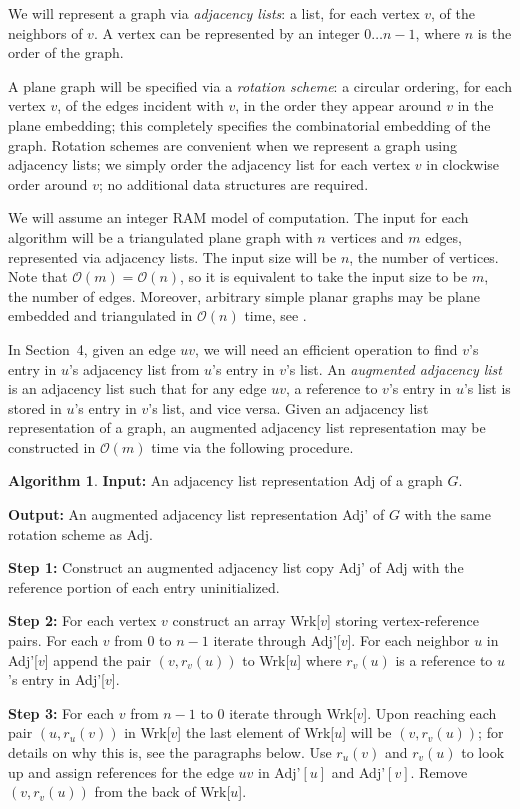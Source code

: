 \documentclass[12pt,letterpaper]{article}
\theoremstyle{plain}
\theoremstyle{definition}
\theoremstyle{break}
\newtheorem{algorithm}[lemma]{Algorithm}     %
\newcommand{\defterm}[1]{\emph{#1}} %
\begin{document}
We will represent a graph via \textit{adjacency lists}:
a list, for each vertex $v$, of the neighbors of $v$.
A vertex can be represented by an integer $0\dots n-1$,
where $n$ is the order of the graph.

A plane graph will be specified via
a \defterm{rotation scheme}:
a circular ordering,
for each vertex $v$, of the edges incident with $v$,
in the order they appear around $v$ in the plane embedding;
this completely specifies
the combinatorial embedding of the graph.
Rotation schemes are convenient when we represent a graph
using adjacency lists;
we simply order the adjacency
list for each vertex $v$ in clockwise order around $v$;
no additional data structures are required.

We will assume an integer RAM model of computation. The input for each algorithm
will be a triangulated plane graph with $n$ vertices and $m$ edges, represented
via adjacency lists. The input size will be $n$, the number of vertices. Note
that $\mathcal{O}(m)=\mathcal{O}(n)$, so it is equivalent to take the input size
to be $m$, the number of edges. Moreover, arbitrary simple planar graphs may be
plane embedded and triangulated in $\mathcal{O}(n)$ time, see
\cite{BoMy2004}.

In Section~4, given an edge $uv$, we will need an efficient operation to
find $v$'s entry in $u$'s adjacency list from $u$'s entry in $v$'s list.
An \defterm{augmented adjacency list} is an adjacency list such that for
any edge $uv$, a reference to $v$'s entry in
$u$'s list is stored in $u$'s entry in $v$'s list, and vice versa. Given an
adjacency list representation of a graph, an augmented
adjacency list representation may be constructed in $\mathcal{O}(m)$ time via
the following procedure.

\begin{algorithm} \label{A:augment}
\textbf{Input:} An adjacency list representation Adj of a graph $G$.

\noindent\textbf{Output:} An augmented adjacency list representation Adj' of $G$
with the same rotation scheme as Adj.

\noindent\textbf{Step 1:} Construct an augmented adjacency list copy Adj' of Adj
with the reference portion of each entry uninitialized.

\noindent\textbf{Step 2:} For each vertex $v$ construct an array Wrk[$v$]
storing vertex-reference pairs. For each $v$ from $0$ to $n-1$ iterate through
Adj'[$v$]. For each neighbor $u$ in Adj'[$v$] append the pair $(v,r_v(u))$ to
Wrk[$u$] where $r_v(u)$ is a reference to $u$'s entry in Adj'[$v$].

\noindent\textbf{Step 3:} For each $v$ from $n-1$ to $0$ iterate through
Wrk[$v$]. Upon reaching each pair $(u,r_u(v))$ in Wrk[$v$] the last element of
Wrk[$u$] will be $(v,r_v(u))$; for details on why this is, see the paragraphs
below. Use
$r_u(v)$ and $r_v(u)$ to look up and assign references for the edge $uv$ in
Adj'$[u]$ and Adj'$[v]$. Remove $(v,r_v(u))$ from the back of Wrk[$u$].
\end{algorithm}
\end{document}
